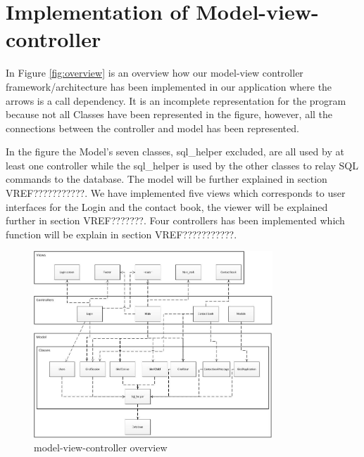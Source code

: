 \section{Implementation of Model-view-controller}
In Figure \vref{fig:overview} is an overview how our model-view controller framework/architecture has been implemented in our application where the arrows is a call dependency. It is an incomplete representation for the program because not all Classes have been represented in the figure, however, all the connections between the controller and model has been represented. 

In the figure the Model's seven classes, sql_helper excluded, are all used by at least one controller while the sql_helper is used by the other classes to relay SQL commands to the database. The model will be further explained in section VREF{???????????}. We have implemented five views which corresponds to user interfaces for the Login and the contact book, the viewer will be explained further in section VREF{???????}. Four controllers has been implemented which function will be explain in section VREF{???????????}.

\begin{figure}[ht]
	\centering
		\includegraphics[width=0.80\textwidth]{img/overview.jpg}
	\caption{model-view-controller overview}
	\label{fig:overview}
\end{figure}
